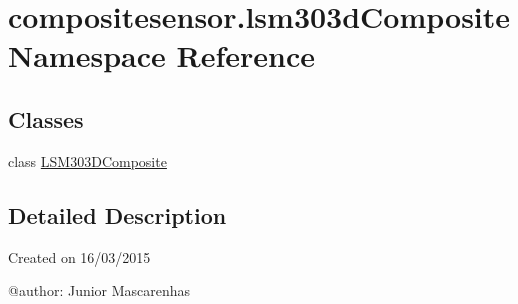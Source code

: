\hypertarget{namespacecompositesensor_1_1lsm303dComposite}{}\section{compositesensor.\+lsm303d\+Composite Namespace Reference}
\label{namespacecompositesensor_1_1lsm303dComposite}
\subsection*{Classes}
\begin{DoxyCompactItemize}
\item 
class \hyperlink{classcompositesensor_1_1lsm303dComposite_1_1LSM303DComposite}{L\+S\+M303\+D\+Composite}
\end{DoxyCompactItemize}


\subsection{Detailed Description}
\begin{DoxyVerb}Created on 16/03/2015

@author: Junior Mascarenhas
\end{DoxyVerb}
 
